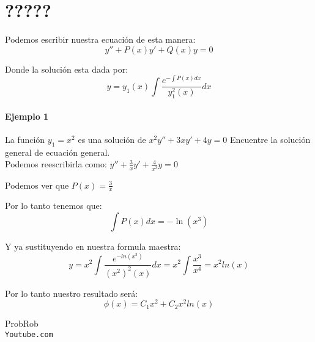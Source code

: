\documentclass[12pt]{report}                               %
\begin{document}
\chapter{?????}
    \clearpage

    Podemos escribir nuestra ecuación de esta manera:
    \begin{equation}
        y'' + P(x) y' + Q(x) y = 0
    \end{equation}

    Donde la solución esta dada por:
    \begin{equation}
        y = y_1(x) \int \frac{ e^{-\int P(x) dx} }{y_1^2(x)} dx
    \end{equation}

    \subsubsection{Ejemplo 1}
    La función $y_1 = x^2$ es una solución de $x^2 y'' + 3xy' +4y = 0$
    Encuentre la solución general de ecuación general. \\

    Podemos reescribirla como:
    $y'' + \frac{3}{x}y' + \frac{4}{x^2}y = 0 $

    Podemos ver que $P(x) = \frac{3}{x}$

    Por lo tanto tenemos que:
    \begin{equation*}
        \int P(x) dx = -\ln (x^3)
    \end{equation*}

    Y ya sustituyendo en nuestra formula maestra:
    \begin{equation*}
        y = x^2 \int \frac{ e^{-ln(x^3)} }{(x^2)^2(x)} dx = x^2 \int \frac{x^3}{x^4} = x^2 ln(x)
    \end{equation*}

    Por lo tanto nuestro resultado será:
    \begin{equation*}
        \phi(x) = C_1 x^2 + C_2 x^2 ln(x)
    \end{equation*}



\clearpage

    \begin{thebibliography}{9}

        ProbRob
        \\\texttt{Youtube.com}


     

\end{thebibliography}
\end{document}
